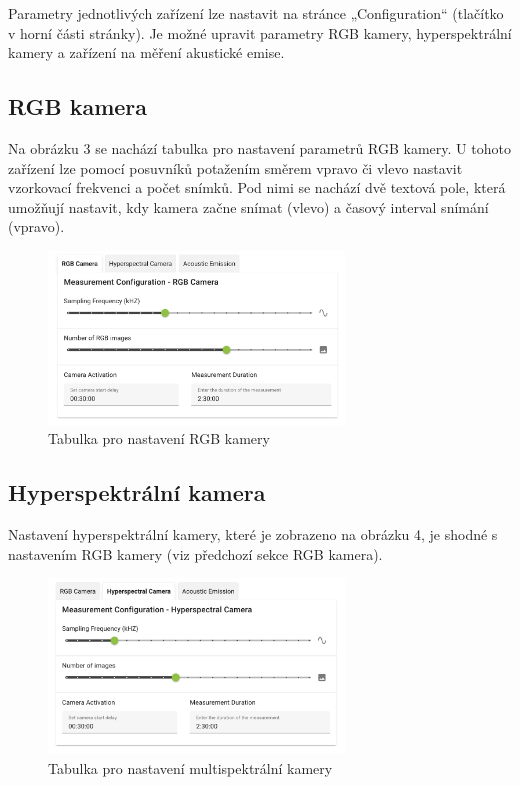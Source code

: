 \documentclass[12pt]{article}
\begin{document}
\begin{teamwork}
        Parametry jednotlivých zařízení lze nastavit na stránce „Configuration“ (tlačítko v horní části stránky).
        Je možné upravit parametry RGB kamery, hyperspektrální kamery a zařízení na měření akustické emise.

        \subsection{RGB kamera}\label{subsec:rgb-kamera}

        Na obrázku 3 se nachází tabulka pro nastavení parametrů RGB kamery.
        U tohoto zařízení lze pomocí posuvníků
        potažením směrem vpravo či vlevo nastavit vzorkovací frekvenci a počet snímků.
        Pod nimi se nachází dvě textová
        pole, která umožňují nastavit, kdy kamera začne snímat (vlevo) a časový interval snímání (vpravo).

        \begin{figure}[hbt!]
            \centering
            \includegraphics[width=0.7\textwidth]{../../img/rgb_cam_settings}
            \caption{Tabulka pro nastavení RGB kamery}
            \label{fig:rgb_cam_settings}
        \end{figure}

        \subsection{Hyperspektrální kamera}\label{subsec:hyperspektralni-kamera}

        Nastavení hyperspektrální kamery, které je zobrazeno na obrázku 4,
        je shodné s nastavením RGB kamery (viz předchozí sekce RGB kamera).

        \begin{figure}[hbt!]
            \centering
            \includegraphics[width=0.7\textwidth]{../../img/multi_cam_settings}
            \caption{Tabulka pro nastavení multispektrální kamery}
            \label{fig:multi_cam_settings}
        \end{figure}


\end{teamwork}
\end{document}
